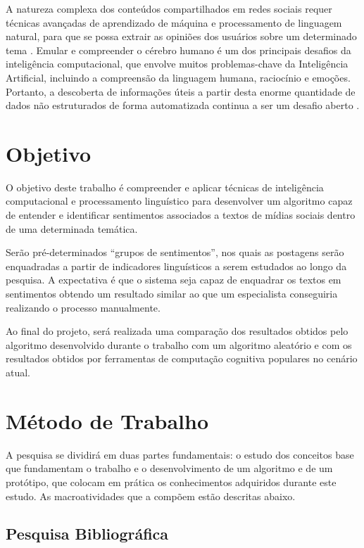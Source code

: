 \documentclass[
	12pt,				%
	openright,			%
	oneside,			%
	a4paper,			%
	english,			%
	spanish,			%
	brazil				%
	]{abntex2}
\begin{document}
	A natureza complexa dos conteúdos compartilhados em redes sociais requer técnicas avançadas de aprendizado de máquina e processamento de linguagem natural, para que se possa extrair as opiniões dos usuários sobre um determinado tema \cite{article_sentiment_twitter}. Emular e compreender o cérebro humano é um dos principais desafios da inteligência computacional, que envolve muitos problemas-chave da Inteligência Artificial, incluindo a compreensão da linguagem humana, raciocínio e emoções. Portanto, a descoberta de informações úteis a partir desta enorme quantidade de dados não estruturados de forma automatizada continua a ser um desafio aberto \cite{article_tweet_crisis}.
	 
	
	\section{Objetivo}
	
	O objetivo deste trabalho é  compreender e aplicar técnicas de inteligência computacional e processamento linguístico para desenvolver um algoritmo capaz de entender e identificar sentimentos associados a textos de mídias sociais dentro de uma determinada temática. 
	
	 Serão pré-determinados ``grupos de sentimentos'', nos quais as postagens serão enquadradas a partir de indicadores linguísticos a serem estudados ao longo da pesquisa. A expectativa é que o sistema seja capaz de enquadrar os textos em sentimentos obtendo um resultado similar ao que um especialista conseguiria realizando o processo manualmente.
	
	Ao final do projeto, será realizada uma comparação dos resultados obtidos pelo algoritmo desenvolvido durante o trabalho com um algoritmo aleatório e com os resultados obtidos por ferramentas de computação cognitiva populares no cenário atual.	
	
	\section{Método de Trabalho}
	   
	   A pesquisa se dividirá em duas partes fundamentais: o estudo dos conceitos base que fundamentam o trabalho e o desenvolvimento de um algoritmo e de um protótipo, que colocam em prática os conhecimentos adquiridos durante este estudo. As macroatividades que a compõem estão descritas abaixo.
		
		
		\subsection*{Pesquisa Bibliográfica}
		
\end{document}
